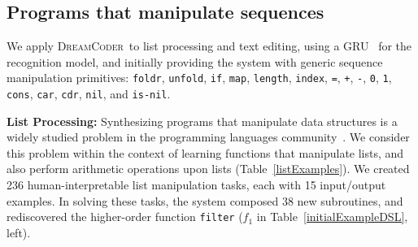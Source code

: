 \documentclass{article}
\newcommand{\system}{\textsc{DreamCoder}~}
\newcommand{\code}[1]{{\footnotesize\texttt{#1}}}
\begin{document}
\subsection{Programs that manipulate sequences}\label{sequences}
We apply \system to list processing %
and text editing, %
using a GRU~\cite{cho2014learning} for
the recognition model, and initially providing the system with generic sequence manipulation primitives:
\code{foldr}, \code{unfold}, \code{if}, \code{map}, \code{length},
\code{index}, \code{=}, \code{+}, \code{-}, \code{0}, \code{1}, \code{cons},
\code{car}, \code{cdr}, \code{nil}, and \code{is-nil}.



\textbf{List Processing:} Synthesizing programs that manipulate data structures is a widely studied
problem in the programming languages community~\cite{feser2015synthesizing}.
We consider this problem within the context of learning functions that
manipulate lists, and also perform arithmetic operations upon lists (Table~\ref{listExamples}).
We created 236 human-interpretable list manipulation tasks, each with 15
input/output examples.
In solving these tasks, the system
composed 38 new subroutines, and rediscovered the higher-order
function \code{filter} ($f_1$ in Table~\ref{initialExampleDSL}, left).%
\end{document}
